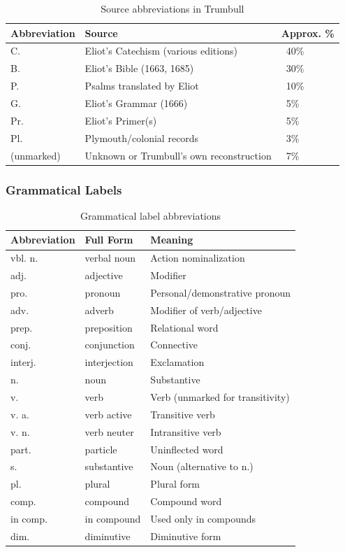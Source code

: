 \begin{table}[h]
\centering
\begin{tabular}{lll}
\toprule
Abbreviation & Source & Approx. \% \\
\midrule
C. & Eliot's Catechism (various editions) & ~40\% \\
B. & Eliot's Bible (1663, 1685) & ~30\% \\
P. & Psalms translated by Eliot & ~10\% \\
G. & Eliot's Grammar (1666) & ~5\% \\
Pr. & Eliot's Primer(s) & ~5\% \\
Pl. & Plymouth/colonial records & ~3\% \\
(unmarked) & Unknown or Trumbull's own reconstruction & ~7\% \\
\bottomrule
\end{tabular}
\caption{Source abbreviations in Trumbull}
\label{tab:1363-sources}
\end{table}

\subsubsection{Grammatical Labels}

\begin{table}[h]
\centering
\begin{tabular}{lll}
\toprule
Abbreviation & Full Form & Meaning \\
\midrule
vbl. n. & verbal noun & Action nominalization \\
adj. & adjective & Modifier \\
pro. & pronoun & Personal/demonstrative pronoun \\
adv. & adverb & Modifier of verb/adjective \\
prep. & preposition & Relational word \\
conj. & conjunction & Connective \\
interj. & interjection & Exclamation \\
n. & noun & Substantive \\
v. & verb & Verb (unmarked for transitivity) \\
v. a. & verb active & Transitive verb \\
v. n. & verb neuter & Intransitive verb \\
part. & particle & Uninflected word \\
s. & substantive & Noun (alternative to n.) \\
pl. & plural & Plural form \\
comp. & compound & Compound word \\
in comp. & in compound & Used only in compounds \\
dim. & diminutive & Diminutive form \\
\bottomrule
\end{tabular}
\caption{Grammatical label abbreviations}
\label{tab:1363-grammar}
\end{table}

